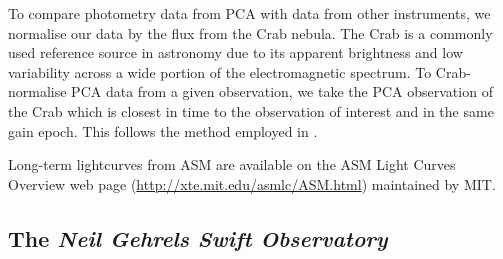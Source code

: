 \par To compare photometry data from PCA with data from other instruments, we normalise our data by the flux from the Crab nebula.  The Crab is a commonly used reference source in astronomy due to its apparent brightness and low variability across a wide portion of the electromagnetic spectrum.  To Crab-normalise PCA data from a given observation, we take the PCA observation of the Crab which is closest in time to the observation of interest and in the same gain epoch.  This follows the method employed in \citet{Altamirano_CrabNorm}.
\par Long-term lightcurves from ASM are available on the ASM Light Curves Overview web page (\url{http://xte.mit.edu/asmlc/ASM.html}) maintained by MIT.

\subsection{The \textit{Neil Gehrels Swift Observatory}}


